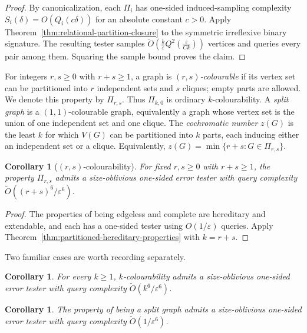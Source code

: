 \documentclass[11pt,reqno,letterpaper]{amsart}
\theoremstyle{plain}
\newtheorem{cor}[thm]{Corollary}
\theoremstyle{remark}
\begin{document}
\begin{proof}
By canonicalization, each $\Pi_i$ has one-sided induced-sampling complexity $S_i(\delta)=O(Q_i(c\delta))$ for an absolute constant $c>0$.  Apply Theorem~\ref{thm:relational-partition-closure} to the symmetric irreflexive binary signature.  The resulting tester samples
\(\widetilde O\!\left( \frac{k}{\varepsilon} Q^2\!\left(\frac{\varepsilon}{Ck}\right) \right)\)
vertices and queries every pair among them.  Squaring the sample bound proves the claim.
\end{proof}

For integers $r,s\geq0$ with $r+s\geq1$, a graph is
\textit{$(r,s)$-colourable} if its vertex set can be partitioned into $r$
independent sets and $s$ cliques; empty parts are allowed.  We denote this
property by $\Pi_{r,s}$. Thus $\Pi_{k,0}$ is ordinary $k$-colourability.  A \textit{split graph} is a
$(1,1)$-colourable graph, equivalently a graph whose vertex set is the union of
one independent set and one clique.  The \textit{cochromatic number} $z(G)$ is
the least $k$ for which $V(G)$ can be partitioned into $k$ parts, each inducing
either an independent set or a clique.  Equivalently,
\(z(G)=\min\{r+s:G\in\Pi_{r,s}\}\).

\begin{cor}[$(r,s)$-colourability]
\label{cor:rs-colourability}
For fixed $r,s\geq0$ with $r+s\geq1$, the property $\Pi_{r,s}$ admits a size-oblivious one-sided error tester with query complexity
\(\widetilde O\!\left(
{(r+s)^6}/{\varepsilon^6}
\right)\).
\end{cor}

\begin{proof}
The properties of being edgeless and complete are hereditary and extendable, and each has a one-sided tester using $O(1/\varepsilon)$ queries.  Apply Theorem~\ref{thm:partitioned-hereditary-properties} with $k=r+s$.
\end{proof}

Two familiar cases are worth recording separately.

\begin{cor}\label{cor:color}
For every $k\geq1$, $k$-colourability admits a size-oblivious one-sided error tester with query complexity $\widetilde O(k^6/\varepsilon^6)$.
\end{cor}

\begin{cor}\label{cor:split}
The property of being a split graph admits a size-oblivious one-sided error tester with query complexity $\widetilde O(1/\varepsilon^6)$.
\end{cor}
\end{document}
